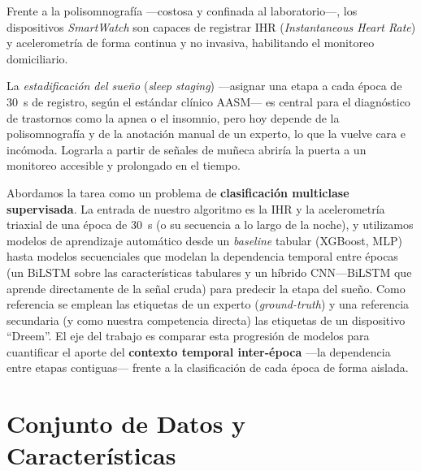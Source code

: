\documentclass[conference]{IEEEtran}
\begin{document}
Frente a la polisomnografía ---costosa y confinada al laboratorio---, los dispositivos \emph{SmartWatch} son capaces de registrar IHR (\emph{Instantaneous Heart Rate}) y acelerometría de forma continua y no invasiva, habilitando el monitoreo domiciliario.

La \emph{estadificación del sueño} (\emph{sleep staging}) ---asignar una etapa a cada época de \qty{30}{\second} de registro, según el estándar clínico AASM--- es central para el diagnóstico de trastornos como la apnea o el insomnio, pero hoy depende de la polisomnografía y de la anotación manual de un experto, lo que la vuelve cara e incómoda. Lograrla a partir de señales de muñeca abriría la puerta a un monitoreo accesible y prolongado en el tiempo.

Abordamos la tarea como un problema de \textbf{clasificación multiclase supervisada}. La entrada de nuestro algoritmo es la IHR y la acelerometría triaxial de una época de \qty{30}{\second} (o su secuencia a lo largo de la noche), y utilizamos modelos de aprendizaje automático desde un \emph{baseline} tabular (XGBoost, MLP) hasta modelos secuenciales que modelan la dependencia temporal entre épocas (un BiLSTM sobre las características tabulares y un híbrido CNN---BiLSTM que aprende directamente de la señal cruda) para predecir la etapa del sueño. Como referencia se emplean las etiquetas de un experto (\emph{ground-truth}) y una referencia secundaria (y como nuestra competencia directa) las etiquetas de un dispositivo ``Dreem''. El eje del trabajo es comparar esta progresión de modelos para cuantificar el aporte del \textbf{contexto temporal inter-época} ---la dependencia entre etapas contiguas--- frente a la clasificación de cada época de forma aislada.

\section{Conjunto de Datos y Características}
\end{document}
